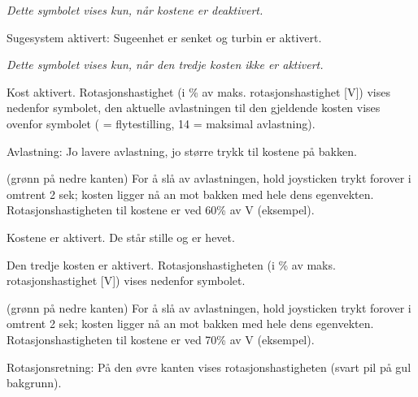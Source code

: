 {\em Dette symbolet vises kun, når kostene er deaktivert.}

\startSymVpad
{}
\SymVpad
{} Sugesystem aktivert:
Sugeenhet er senket og turbin er aktivert.
\stopSymVpad



{\em Dette symbolet vises kun, når den tredje kosten ikke er aktivert.}

\startSymVpad
{}
\SymVpad
{} Kost aktivert. Rotasjonshastighet (i \% av maks. rotasjonshastighet [V]) vises nedenfor symbolet, den aktuelle avlastningen til den gjeldende kosten vises ovenfor symbolet (\type{ } = flytestilling, 14 = maksimal avlastning).

{\md Avlastning:} {\lt Jo lavere avlastning, jo større trykk til kostene på bakken.}
\stopSymVpad


\startSymVpad
{}
\SymVpad
{}(grønn på nedre kanten)
For å slå av avlastningen, hold joysticken trykt forover i omtrent 2 sek; kosten ligger nå an mot bakken med hele dens egenvekten. Rotasjonshastigheten til kostene er ved 60\hairspace\% av V (eksempel).
\stopSymVpad

\startSymVpad
{}
\SymVpad
{} Kostene er aktivert. De står stille og er hevet.
\stopSymVpad



\startSymVpad
{}
\SymVpad
{} Den tredje kosten er aktivert. Rotasjonshastigheten (i \% av maks. rotasjonshastighet [V]) vises nedenfor symbolet.
\stopSymVpad


\startSymVpad
{}
\SymVpad
{}(grønn på nedre kanten)
For å slå av avlastningen, hold joysticken trykt forover i omtrent 2 sek; kosten ligger nå an mot bakken med hele dens egenvekten. Rotasjonshastigheten til kostene er ved 70\hairspace\% av V (eksempel).

{\md Rotasjonsretning:} {\lt På den øvre kanten vises rotasjonshastigheten (svart pil på gul bakgrunn).}
\stopSymVpad

\stopsection




